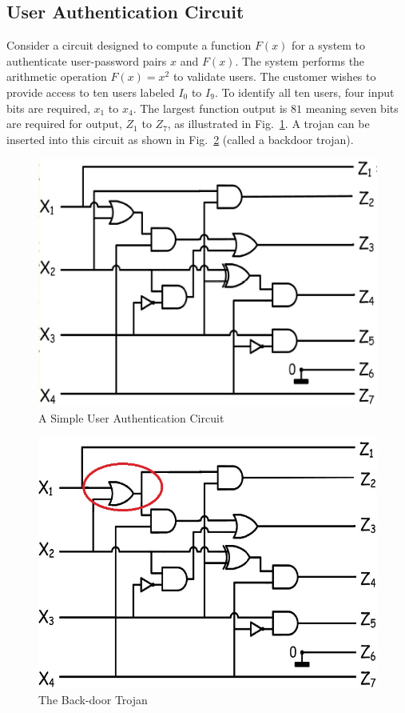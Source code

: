 \documentclass[conference]{IEEEtran}
\begin{document}
\subsection{User Authentication Circuit} \label{sec:userAuthentication}
Consider a circuit designed to compute a function $F(x)$ for a system to authenticate user-password pairs $x$ and $F(x)$.
The system performs the arithmetic operation $F(x) = x^2$ to validate users.
The customer wishes to provide access to ten users labeled $I_0$ to $I_9$.
To identify all ten users, four input bits are required, $x_1$ to $x_4$.
The largest function output is $81$ meaning seven bits are required for output, $Z_1$ to $Z_7$, as illustrated in Fig.~\ref{fig:userAuthenticationCircuit}.
A trojan can be inserted into this circuit as shown in Fig.~\ref{fig:userAuthenticationCircuitTrojan} (called a backdoor trojan).
\begin{figure}[h]
	\centering
	\includegraphics[width=0.7\linewidth]{../Thesis/Figures/circuit1}
	\caption{A Simple User Authentication Circuit}
	\label{fig:userAuthenticationCircuit}
\end{figure}
\begin{figure}[h]
	\centering
	\includegraphics[width=0.7\linewidth]{../Thesis/Figures/circuit2}
	\caption{The Back-door Trojan}
	\label{fig:userAuthenticationCircuitTrojan}
\end{figure}
\end{document}
